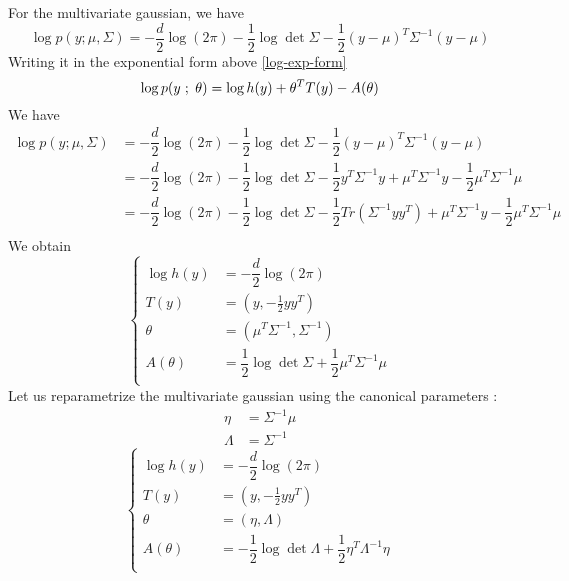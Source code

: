 \documentclass[a4paper, 11pt]{article}
\newcommand{\tr}[1]{Tr\left( #1 \right)}
\newcommand{\ssemi}{\hspace{.3em};\hspace{.3em}}
\begin{document}
For the multivariate gaussian, we have
\begin{displaymath}
  \log{p(y ; \mu, \Sigma)} =
  - \dfrac{d}{2} \log(2 \pi)
  - \dfrac{1}{2} \log\det{\Sigma}
  - \dfrac{1}{2} (y - \mu)^T \Sigma^{-1} (y - \mu)
\end{displaymath}
Writing it in the exponential form above \eqref{log-exp-form}
\begin{displaymath}
  \log{ p(y \ssemi \theta) } = \log{h(y)} + \theta^T T(y) - A(\theta)
\end{displaymath}
We have
\begin{align*}
  \log{p(y ; \mu, \Sigma)}
  & =
    - \dfrac{d}{2} \log(2 \pi)
    - \dfrac{1}{2} \log\det{\Sigma}
    - \dfrac{1}{2} (y - \mu)^T \Sigma^{-1} (y - \mu)
  \\
  & =
    - \dfrac{d}{2} \log(2 \pi)
    - \dfrac{1}{2} \log\det{\Sigma}
    - \dfrac{1}{2} y^T \Sigma^{-1} y
    + \mu^T \Sigma^{-1} y
    - \dfrac{1}{2} \mu^T \Sigma^{-1} \mu
  \\
  & =
    - \dfrac{d}{2} \log(2 \pi)
    - \dfrac{1}{2} \log\det{\Sigma}
    - \dfrac{1}{2} \tr{\Sigma^{-1} y y^T}
    + \mu^T \Sigma^{-1} y
    - \dfrac{1}{2} \mu^T \Sigma^{-1} \mu
  \\
\end{align*}
We obtain
\begin{displaymath}
  \left\{
  \begin{array}{rl}
    \log{h(y)} & = - \dfrac{d}{2} \log(2 \pi) \\[.5em]
    T(y) & = (y, -\frac{1}{2} y y^T) \\[.5em]
    \theta & = (\mu^T \Sigma^{-1}, \Sigma^{-1}) \\[.5em]
    A(\theta) &= \dfrac{1}{2} \log\det{\Sigma} + \dfrac{1}{2} \mu^T \Sigma^{-1} \mu \\
  \end{array}
  \right.
\end{displaymath}
Let us reparametrize the multivariate gaussian using the canonical
parameters :
\begin{align*}
  \eta & =  \Sigma^{-1} \mu \\
  \Lambda & = \Sigma^{-1}
\end{align*}
\begin{displaymath}
  \left\{
  \begin{array}{rl}
    \log{h(y)} & = - \dfrac{d}{2} \log(2 \pi) \\[.5em]
    T(y) & = (y, -\frac{1}{2} y y^T) \\[.5em]
    \theta & = (\eta, \Lambda) \\[.5em]
    A(\theta) &= -\dfrac{1}{2} \log\det{\Lambda} + \dfrac{1}{2} \eta^T \Lambda^{-1} \eta \\
  \end{array}
  \right.
\end{displaymath}
\end{document}
